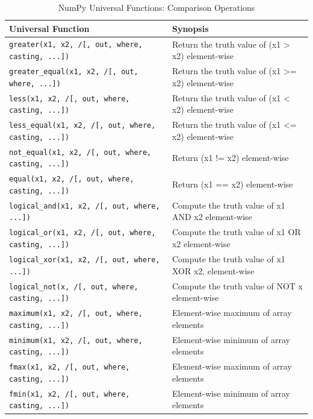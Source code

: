 \documentclass[a4paper,11pt]{book}
\begin{document}
\begin{appendices}
\begin{table}
	\centering
\caption{NumPy Universal Functions: Comparison Operations}
\label{tab:numpy_comparison_ufuncs}
\centering
\begin{tabular}{lp{13cm}}
\toprule \toprule 
Universal Function & Synopsis \\ \midrule
\texttt{greater(x1, x2, /[, out, where, casting, ...])}
& Return the truth value of (x1 > x2) element-wise\\
\texttt{greater\_equal(x1, x2, /[, out, where, ...])}
& Return the truth value of (x1 >= x2) element-wise\\
\texttt{less(x1, x2, /[, out, where, casting, ...])}
& Return the truth value of (x1 < x2) element-wise\\
\texttt{less\_equal(x1, x2, /[, out, where, casting, ...])}
& Return the truth value of (x1 <= x2) element-wise\\
\texttt{not\_equal(x1, x2, /[, out, where, casting, ...])}
& Return (x1 != x2) element-wise\\
\texttt{equal(x1, x2, /[, out, where, casting, ...])}
& Return (x1 == x2) element-wise\\
\texttt{logical\_and(x1, x2, /[, out, where, ...])}
& Compute the truth value of x1 AND x2 element-wise\\
\texttt{logical\_or(x1, x2, /[, out, where, casting, ...])}
& Compute the truth value of x1 OR x2 element-wise\\
\texttt{logical\_xor(x1, x2, /[, out, where, ...])}
& Compute the truth value of x1 XOR x2, element-wise\\
\texttt{logical\_not(x, /[, out, where, casting, ...])}
& Compute the truth value of NOT x element-wise\\
\texttt{maximum(x1, x2, /[, out, where, casting, ...])}
& Element-wise maximum of array elements\\
\texttt{minimum(x1, x2, /[, out, where, casting, ...])}
& Element-wise minimum of array elements\\
\texttt{fmax(x1, x2, /[, out, where, casting, ...])}
& Element-wise maximum of array elements\\
\texttt{fmin(x1, x2, /[, out, where, casting, ...])}
& Element-wise minimum of array elements\\
\bottomrule
\end{tabular}
\end{table}
\clearpage


\end{appendices}
\end{document}
